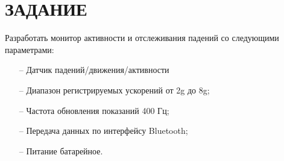 \begin{sloppypar} %
\newpage %
\section*{ЗАДАНИЕ} %

Разработать монитор активности и отслеживания падений  со следующими параметрами: 
\begin{itemize}
    \item[--]	Датчик падений/движения/активности
    \item[--]	Диапазон регистрируемых ускорений от 2g до 8g;
   \item[--]	Частота обновления показаний 400 Гц;
   \item[--]Передача данных по интерфейсу Bluetooth;
   \item[--]	Питание батарейное.
\end{itemize}

\end{sloppypar}
